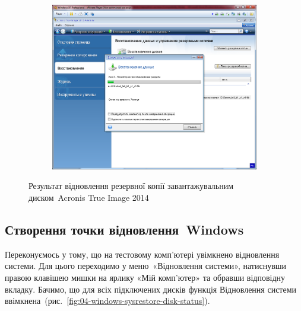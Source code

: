 \documentclass[
	a4paper,
	oneside,
	DIV = 12,
	fontsize = 13pt,
	headings = normal,
]{scrartcl}
\begin{document}
\begin{figure}[!htbp]
\begin{subfigure}{0.5\columnwidth}
					\includegraphics[height = 8\baselineskip]{./assets/y03s01-pcdiag-lab-04-p06.png}
					\caption{}
					\label{subfig:02-01-acronis-true-image-disk-restore-res}
				\end{subfigure}%
				\caption{Результат відновлення резервної копії завантажувальним диском~\textenglish{Acronis True Image 2014}}
				\label{fig:03-acronis-true-image-disk-restore}
			\end{figure}

		\subsection{Створення точки відновлення~\textenglish{Windows}}
			Переконуємось у тому, що на тестовому комп'ютері увімкнено відновлення системи. Для цього переходимо у меню~«Відновлення системи», натиснувши правою клавішею мишки на ярлику «Мій комп'ютер» та обравши відповідну вкладку. Бачимо, що для всіх підключених дисків функція Відновлення системи ввімкнена~(рис.~\ref{fig:04-windows-sysrestore-disk-status}).
\end{document}
